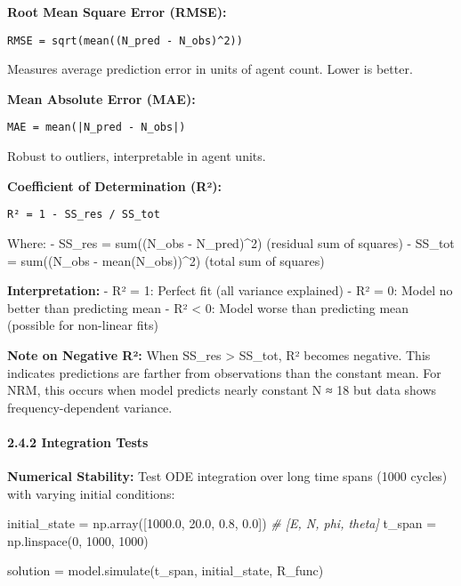 \documentclass[
]{article}
\newenvironment{Shaded}{}{}
\newcommand{\CommentTok}[1]{\textcolor[rgb]{0.38,0.63,0.69}{\textit{#1}}}
\newcommand{\DecValTok}[1]{\textcolor[rgb]{0.25,0.63,0.44}{#1}}
\newcommand{\FloatTok}[1]{\textcolor[rgb]{0.25,0.63,0.44}{#1}}
\newcommand{\NormalTok}[1]{#1}
\newcommand{\OperatorTok}[1]{\textcolor[rgb]{0.40,0.40,0.40}{#1}}
\begin{document}
\textbf{Root Mean Square Error (RMSE):}

\begin{verbatim}
RMSE = sqrt(mean((N_pred - N_obs)^2))
\end{verbatim}

Measures average prediction error in units of agent count. Lower is
better.

\textbf{Mean Absolute Error (MAE):}

\begin{verbatim}
MAE = mean(|N_pred - N_obs|)
\end{verbatim}

Robust to outliers, interpretable in agent units.

\textbf{Coefficient of Determination (R²):}

\begin{verbatim}
R² = 1 - SS_res / SS_tot
\end{verbatim}

Where: - SS\_res = sum((N\_obs - N\_pred)\^{}2) (residual sum of
squares) - SS\_tot = sum((N\_obs - mean(N\_obs))\^{}2) (total sum of
squares)

\textbf{Interpretation:} - R² = 1: Perfect fit (all variance explained)
- R² = 0: Model no better than predicting mean - R² \textless{} 0: Model
worse than predicting mean (possible for non-linear fits)

\textbf{Note on Negative R²:} When SS\_res \textgreater{} SS\_tot, R²
becomes negative. This indicates predictions are farther from
observations than the constant mean. For NRM, this occurs when model
predicts nearly constant N ≈ 18 but data shows frequency-dependent
variance.

\paragraph{2.4.2 Integration Tests}\label{integration-tests}

\textbf{Numerical Stability:} Test ODE integration over long time spans
(1000 cycles) with varying initial conditions:

\begin{Shaded}
\begin{Highlighting}[]
\NormalTok{initial\_state }\OperatorTok{=}\NormalTok{ np.array([}\FloatTok{1000.0}\NormalTok{, }\FloatTok{20.0}\NormalTok{, }\FloatTok{0.8}\NormalTok{, }\FloatTok{0.0}\NormalTok{])  }\CommentTok{\# [E, N, phi, theta]}
\NormalTok{t\_span }\OperatorTok{=}\NormalTok{ np.linspace(}\DecValTok{0}\NormalTok{, }\DecValTok{1000}\NormalTok{, }\DecValTok{1000}\NormalTok{)}

\NormalTok{solution }\OperatorTok{=}\NormalTok{ model.simulate(t\_span, initial\_state, R\_func)}
\end{Highlighting}
\end{Shaded}
\end{document}
